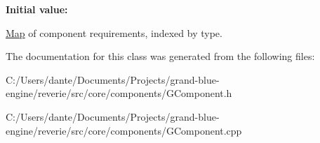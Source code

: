 {\bfseries Initial value\+:}
\begin{DoxyCode}{0}
\DoxyCodeLine{=}
\DoxyCodeLine{\{ }
\DoxyCodeLine{    }
\DoxyCodeLine{\}}

\end{DoxyCode}


\mbox{\hyperlink{classrev_1_1_map}{Map}} of component requirements, indexed by type. 



The documentation for this class was generated from the following files\+:\begin{DoxyCompactItemize}
\item 
C\+:/\+Users/dante/\+Documents/\+Projects/grand-\/blue-\/engine/reverie/src/core/components/G\+Component.\+h\item 
C\+:/\+Users/dante/\+Documents/\+Projects/grand-\/blue-\/engine/reverie/src/core/components/G\+Component.\+cpp\end{DoxyCompactItemize}

